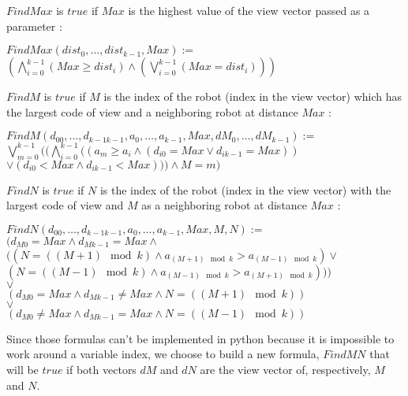 \documentclass{article}
\begin{document}
$FindMax$ is $true$ if $Max$ is the highest value of the view vector passed as a parameter :

\begin{center}

$FindMax(dist_{0}, \ldots ,dist_{k-1}, Max):=$\\
$(\bigwedge_{i=0}^{k-1} (Max \geq dist_{i}) \land (\bigvee_{i=0}^{k-1} (Max = dist_{i})))$
\end{center}

$FindM$ is $true$ if $M$ is the index of the robot (index in the view vector) which has the largest code of view and a neighboring robot at distance $Max$ :

\begin{center}

$FindM(d_{00}, \ldots ,d_{k-1k-1}, a_{0}, \ldots , a_{k-1}, Max, dM_{0}, \dots, dM_{k-1}):=$\\
$\bigvee_{m=0}^{k-1}((\bigwedge_{i=0}^{k-1} ((a_{m} \geq a_i \land (d_{i0} = Max \lor d_{ik-1} = Max))$\\
$\lor (d_{i0} < Max \land d_{ik-1} < Max))) \land M = m )$
\end{center}

$FindN$ is $true$ if $N$ is the index of the robot (index in the view vector) with the largest code of view and $M$ as a neighboring robot at distance $Max$ :

\begin{center}

$FindN(d_{00}, \ldots ,d_{k-1k-1}, a_{0}, \ldots , a_{k-1}, Max, M, N):=$\\
$(d_{M0} = Max \land d_{Mk-1} = Max \land $\\
$( (N = ((M+1) \mod{k}) \land a_{(M+1) \mod{k}} > a_{(M-1) \mod{k}}) \lor $\\
$(N = ((M-1) \mod{k}) \land a_{(M-1) \mod{k}} > a_{(M+1) \mod{k}})))$\\
$ \lor$\\
$(d_{M0} = Max \land d_{Mk-1} \not= Max \land N = ((M+1)\mod{k}))$\\
$ \lor$\\
$(d_{M0} \not= Max \land d_{Mk-1} = Max \land N = ((M-1)\mod{k}))$
\end{center}

Since those formulas can't be implemented in python because it is impossible to work around a variable index, we choose to build a new formula, $FindMN$ that will be $true$ if both vectors $dM$ and $dN$ are the view vector of, respectively, $M$ and $N$.
\end{document}
